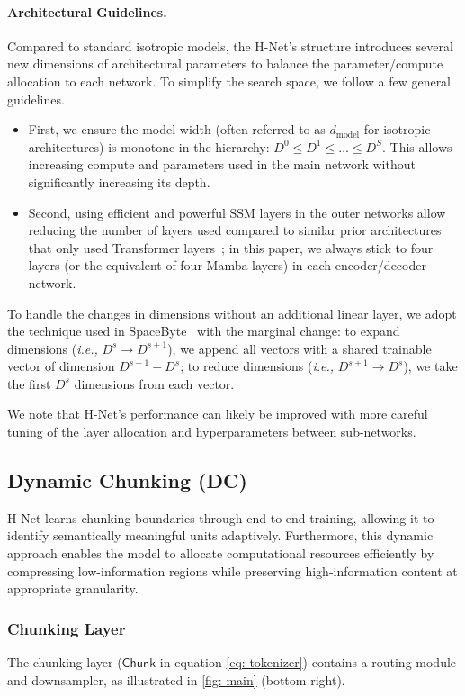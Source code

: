\documentclass{article}
\newcommand{\citep}{\parencite}
\newcommand{\model}{H-Net}
\newcommand{\chunk}{chunking layer}
\newcommand{\CHUNK}{Chunking Layer}
\newcommand{\router}{routing module}
\newcommand{\downsampler}{downsampler}
\newcommand{\ie}{\emph{i.e.,}}
\theoremstyle{plain}
\theoremstyle{remark}
\begin{document}
\paragraph{Architectural Guidelines.}
Compared to standard isotropic models, the H-Net's structure introduces several new dimensions of architectural parameters to balance the parameter/compute allocation to each network.
To simplify the search space, we follow a few general guidelines.
\begin{itemize}
    \item  First, we ensure the model width (often referred to as $d_{\text{model}}$ for isotropic architectures) is monotone in the hierarchy: $D^0 \leq D^1 \leq \dots \leq D^S$.
    This allows increasing compute and parameters used in the main network without significantly increasing its depth.
    \item Second, using efficient and powerful SSM layers in the outer networks allow reducing the number of layers used compared to similar prior architectures that only used Transformer layers~\citep{SpaceByte};
    in this paper, we always stick to four layers (or the equivalent of four Mamba layers) in each encoder/decoder network.
\end{itemize}
To handle the changes in dimensions without an additional linear layer, we adopt the technique used in SpaceByte~\citep{SpaceByte} with the marginal change: to expand dimensions (\ie{} $D^{s} \rightarrow D^{s+1}$), we append all vectors with a shared trainable vector of dimension $D^{s+1}-D^{s}$; to reduce dimensions (\ie{} $D^{s+1} \rightarrow D^{s}$), we take the first $D^{s}$ dimensions from each vector.

We note that H-Net's performance can likely be improved with more careful tuning of the layer allocation and hyperparameters between sub-networks.

\subsection{Dynamic Chunking (DC)}
\label{sec: Method-Dynamic-Chunking-Mechanism}

\model{} learns chunking boundaries through end-to-end training, allowing it to identify semantically meaningful units adaptively.
Furthermore, this dynamic approach enables the model to allocate computational resources efficiently by compressing low-information regions while preserving high-information content at appropriate granularity.

\subsubsection{\CHUNK{}}
\label{sec: tokenizer}
The \chunk{} ($\mathsf{Chunk}$ in equation \eqref{eq: tokenizer}) contains a \router{} and \downsampler{}, as illustrated in \cref{fig: main}-(\colorbox{Chunk}{bottom-right}).
\end{document}
